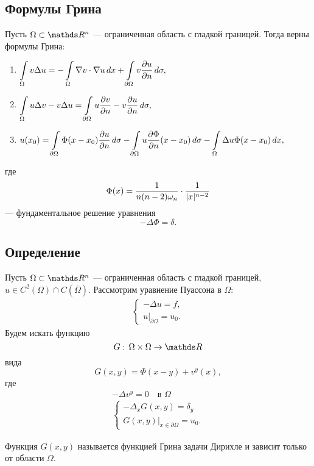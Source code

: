\subsection{Формулы Грина}
Пусть $\Omega \subset \real^n$ --- ограниченная область с гладкой границей. Тогда верны формулы Грина:
\begin{enumerate}
\item $\displaystyle \int \limits_\Omega v \Delta u = - \int \limits_\Omega \nabla v \cdot \nabla u \, dx + \int \limits_{\partial \Omega} v \pder[u]{n} \, d\sigma,$
\item $\displaystyle \int \limits_\Omega u \Delta v - v \Delta u = \int \limits_{\partial \Omega} u \pder[v]{n} - v \pder[u]{n} \, d\sigma,$
\item $\displaystyle u(x_0) = \int \limits_{\partial \Omega} \Phi (x-x_0) \pder[u]{n} \, d\sigma - \int \limits_{\partial \Omega} u \pder[\Phi]{n} (x-x_0) \, d\sigma - \int \limits_\Omega \Delta u \Phi (x - x_0) \, dx,$
\end{enumerate}
где 
$$ \Phi(x) = \frac {1} {n (n-2) \omega_n} \cdot \frac {1} {\abs{x}^{n-2}}$$
--- фундаментальное решение уравнения $$-\Delta \Phi = \delta.$$

\subsection{Определение}
Пусть $\Omega \subset \real^n$ --- ограниченная область с гладкой границей, $u \in C^2(\Omega) \cap C(\overline{\Omega})$. Рассмотрим уравнение Пуассона в $\Omega$:
\begin{align*}
	\begin{cases*}
		- \Delta u = f, \\
		u\Big\rvert_{\partial \Omega} = u_0.
	\end{cases*}
\end{align*}
Будем искать функцию
$$G: \, \Omega \times \Omega \rightarrow \real$$ вида
$$G(x,y) = \Phi (x-y) + v^y (x),$$
где
\begin{gather*}
	- \Delta v^y = 0 \quad \text{в $\Omega$} \\
	\begin{cases*}
		- \Delta_x G(x,y) = \delta_y \\
		G(x,y)\Big\rvert_{x \in \partial \Omega} = u_0.
	\end{cases*}
\end{gather*}
\begin{definition}
Функция $G(x,y)$ называется функцией Грина задачи Дирихле и зависит только от области $\Omega$.
\end{definition}

